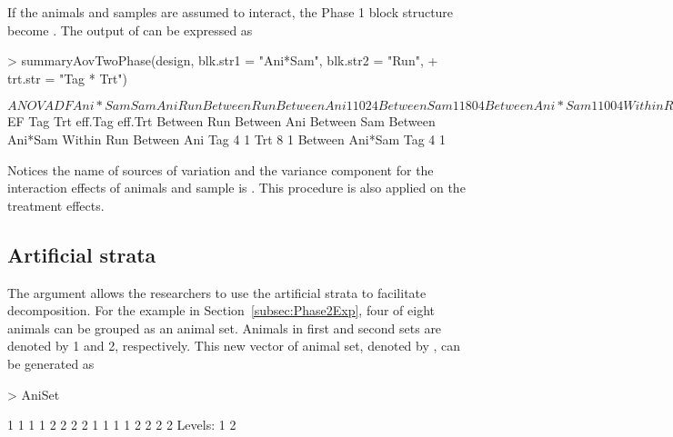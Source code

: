 \documentclass[article]{jss}
\begin{document}
If the animals and samples are assumed to interact, the Phase 1 block structure become . The output of  can be expressed as
\begin{CodeChunk}
\begin{CodeInput}
> summaryAovTwoPhase(design, blk.str1 = "Ani*Sam", blk.str2 = "Run", 
+ trt.str = "Tag * Trt")                                     
\end{CodeInput}
\begin{CodeOutput}
$ANOVA
                   DF Ani*Sam Sam Ani Run
Between Run                              
   Between Ani     1  1       0   2   4  
   Between Sam     1  1       8   0   4  
   Between Ani*Sam 1  1       0   0   4  
Within Run                               
   Between Ani                           
      Tag          1  1       0   2   0  
      Trt          1  1       0   2   0  
      Residual     4  1       0   2   0  
   Between Ani*Sam                       
      Tag          2  1       0   0   0  
      Residual     4  1       0   0   0  

$EF
                   Tag Trt eff.Tag eff.Trt
Between Run                               
   Between Ani                            
   Between Sam                            
   Between Ani*Sam                        
Within Run                                
   Between Ani                            
      Tag          4       1              
      Trt              8           1      
   Between Ani*Sam                        
      Tag          4       1                  
\end{CodeOutput}
\end{CodeChunk}
Notices the name of sources of variation and the variance component for the interaction effects of animals and sample is . This procedure is also applied on the treatment effects. 

\subsection{Artificial strata}
The  argument allows the researchers to use the artificial strata to facilitate decomposition. For the example in Section~\ref{subsec:Phase2Exp}, four of eight animals can be grouped as an animal set. Animals in first and second sets are denoted by 1 and 2, respectively. This new vector of animal set, denoted by , can be generated as
\begin{CodeChunk}
\begin{CodeInput}
> AniSet
\end{CodeInput}
\begin{CodeOutput}
 [1] 1 1 1 1 2 2 2 2 1 1 1 1 2 2 2 2
Levels: 1 2
\end{CodeOutput}
\end{CodeChunk}
\end{document}

